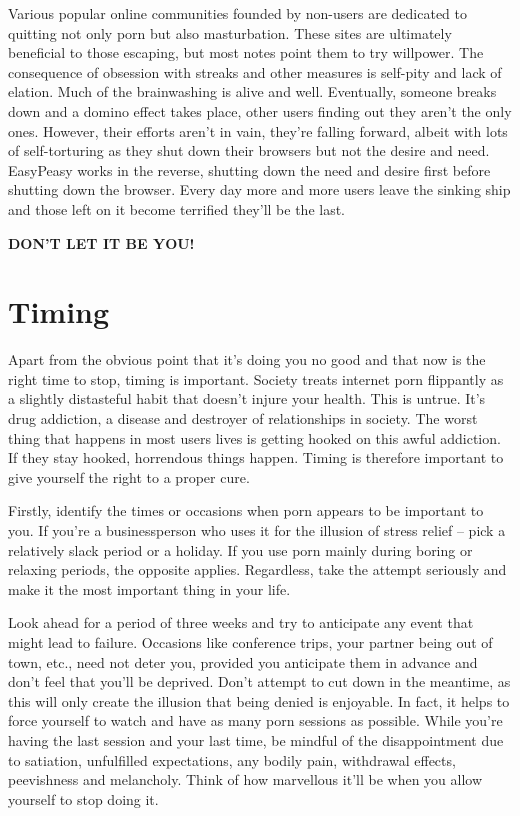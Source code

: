\documentclass[
]{book}
\begin{document}
Various popular online communities founded by non-users are dedicated to quitting not only porn but also masturbation. These sites are ultimately beneficial to those escaping, but most notes point them to try willpower. The consequence of obsession with streaks and other measures is self-pity and lack of elation. Much of the brainwashing is alive and well. Eventually, someone breaks down and a domino effect takes place, other users finding out they aren't the only ones. However, their efforts aren't in vain, they're falling forward, albeit with lots of self-torturing as they shut down their browsers but not the desire and need. EasyPeasy works in the reverse, shutting down the need and desire first before shutting down the browser. Every day more and more users leave the sinking ship and those left on it become terrified they'll be the last.

\textbf{DON'T LET IT BE YOU!}

\hypertarget{timing}{%
\chapter{Timing}\label{timing}}

Apart from the obvious point that it's doing you no good and that now is the right time to stop, timing is important. Society treats internet porn flippantly as a slightly distasteful habit that doesn't injure your health. This is untrue. It's drug addiction, a disease and destroyer of relationships in society. The worst thing that happens in most users lives is getting hooked on this awful addiction. If they stay hooked, horrendous things happen. Timing is therefore important to give yourself the right to a proper cure.

Firstly, identify the times or occasions when porn appears to be important to you. If you're a businessperson who uses it for the illusion of stress relief -- pick a relatively slack period or a holiday. If you use porn mainly during boring or relaxing periods, the opposite applies. Regardless, take the attempt seriously and make it the most important thing in your life.

Look ahead for a period of three weeks and try to anticipate any event that might lead to failure. Occasions like conference trips, your partner being out of town, etc., need not deter you, provided you anticipate them in advance and don't feel that you'll be deprived. Don't attempt to cut down in the meantime, as this will only create the illusion that being denied is enjoyable. In fact, it helps to force yourself to watch and have as many porn sessions as possible. While you're having the last session and your last time, be mindful of the disappointment due to satiation, unfulfilled expectations, any bodily pain, withdrawal effects, peevishness and melancholy. Think of how marvellous it'll be when you allow yourself to stop doing it.
\end{document}
